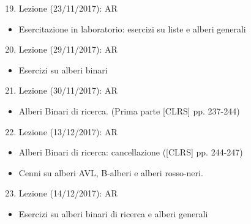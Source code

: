 \documentclass{article}
\providecommand{\tightlist}{%
  \setlength{\itemsep}{0pt}\setlength{\parskip}{0pt}}
\begin{document}
\begin{enumerate}
\setcounter{enumi}{18}
\tightlist
\item
  {Lezione (23/11/2017): AR}
\end{enumerate}

\begin{itemize}
\tightlist
\item
  {Esercitazione in laboratorio: esercizi su liste e alberi generali}
\end{itemize}

\begin{enumerate}
\setcounter{enumi}{19}
\tightlist
\item
  {Lezione (29/11/2017): AR}
\end{enumerate}

\begin{itemize}
\tightlist
\item
  {Esercizi su alberi binari}
\end{itemize}

\begin{enumerate}
\setcounter{enumi}{20}
\tightlist
\item
  {Lezione (30/11/2017): AR}
\end{enumerate}

\begin{itemize}
\tightlist
\item
  {Alberi Binari di ricerca. (Prima parte {[}CLRS{]} pp. 237-244)}
\end{itemize}

\begin{enumerate}
\setcounter{enumi}{21}
\tightlist
\item
  {Lezione (13/12/2017): AR}
\end{enumerate}

\begin{itemize}
\tightlist
\item
  {Alberi Binari di ricerca: cancellazione ({[}CLRS{]} pp. 244-247)}
\item
  {Cenni su alberi AVL, B-alberi e alberi rosso-neri.}
\end{itemize}

\begin{enumerate}
\setcounter{enumi}{22}
\tightlist
\item
  {Lezione (14/12/2017): AR}
\end{enumerate}

\begin{itemize}
\tightlist
\item
  {Esercizi su alberi binari di ricerca e alberi generali}
\end{itemize}
\end{document}
